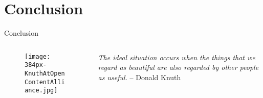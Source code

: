 \section{Conclusion}
	
    \begin{frame}{Conclusion}
		\begin{columns}
			\begin{column}{5cm}
				\begin{figure}
   					\texttt{[image: 384px-KnuthAtOpenContentAlliance.jpg]}
				\end{figure}
			\end{column}
			\begin{column}{5cm}
				\begin{flushright}
					\textit{The ideal situation occurs when
the things that we regard as beautiful
are also regarded by other
people as useful.}
					\vskip 0.5cm
				-- Donald Knuth
				\end{flushright}
			\end{column}
		\end{columns}
	\end{frame}

